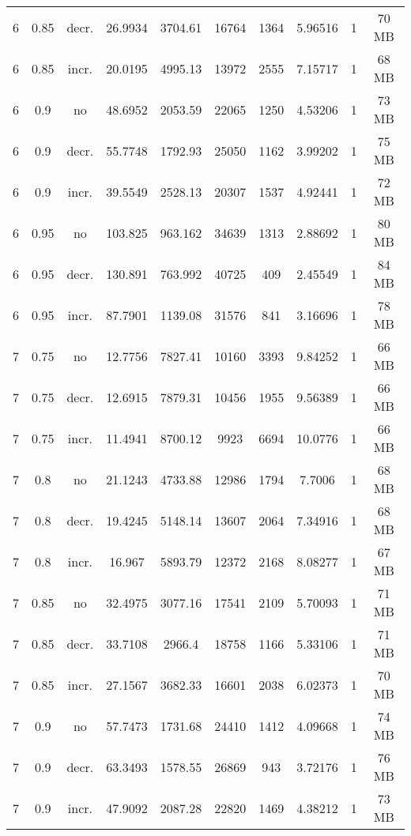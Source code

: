 \begin{longtable}{c|c|c|c|c|c|c|c|c|c}
  6  &  0.85  & decr. & 26.9934  &  3704.61 &  16764  &  1364  &  5.96516  &  1  & 70  MB \\
  6  &  0.85  & incr. & 20.0195  &  4995.13 &  13972  &  2555  &  7.15717  &  1  & 68  MB \\
  \hline
  6  &  0.9   & no    & 48.6952  &  2053.59 &  22065  &  1250  &  4.53206  &  1  & 73  MB \\
  6  &  0.9   & decr. & 55.7748  &  1792.93 &  25050  &  1162  &  3.99202  &  1  & 75  MB \\
  6  &  0.9   & incr. & 39.5549  &  2528.13 &  20307  &  1537  &  4.92441  &  1  & 72  MB \\
  \hline
  6  &  0.95  & no    & 103.825  &  963.162 &  34639  &  1313  &  2.88692  &  1  & 80  MB \\
  6  &  0.95  & decr. & 130.891  &  763.992 &  40725  &  409   &  2.45549  &  1  & 84  MB \\
  6  &  0.95  & incr. & 87.7901  &  1139.08 &  31576  &  841   &  3.16696  &  1  & 78  MB \\
  \hline
  7  &  0.75  & no    & 12.7756  &  7827.41 &  10160  &  3393  &  9.84252  &  1  & 66  MB \\
  7  &  0.75  & decr. & 12.6915  &  7879.31 &  10456  &  1955  &  9.56389  &  1  & 66  MB \\
  7  &  0.75  & incr. & 11.4941  &  8700.12 &  9923   &  6694  &  10.0776  &  1  & 66  MB \\
  \hline
  7  &  0.8   & no    & 21.1243  &  4733.88 &  12986  &  1794  &  7.7006   &  1  & 68  MB \\
  7  &  0.8   & decr. & 19.4245  &  5148.14 &  13607  &  2064  &  7.34916  &  1  & 68  MB \\
  7  &  0.8   & incr. & 16.967   &  5893.79 &  12372  &  2168  &  8.08277  &  1  & 67  MB \\
  \hline
  7  &  0.85  & no    & 32.4975  &  3077.16 &  17541  &  2109  &  5.70093  &  1  & 71  MB \\
  7  &  0.85  & decr. & 33.7108  &  2966.4  &  18758  &  1166  &  5.33106  &  1  & 71  MB \\
  7  &  0.85  & incr. & 27.1567  &  3682.33 &  16601  &  2038  &  6.02373  &  1  & 70  MB \\
  \hline
  7  &  0.9   & no    & 57.7473  &  1731.68 &  24410  &  1412  &  4.09668  &  1  & 74  MB \\
  7  &  0.9   & decr. & 63.3493  &  1578.55 &  26869  &  943   &  3.72176  &  1  & 76  MB \\
  7  &  0.9   & incr. & 47.9092  &  2087.28 &  22820  &  1469  &  4.38212  &  1  & 73  MB \\

\end{longtable}
